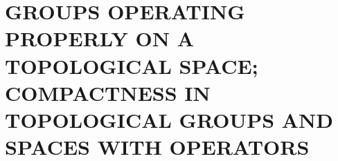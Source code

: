 \section{GROUPS OPERATING PROPERLY ON A TOPOLOGICAL SPACE; COMPACTNESS IN TOPOLOGICAL GROUPS AND SPACES WITH OPERATORS}

